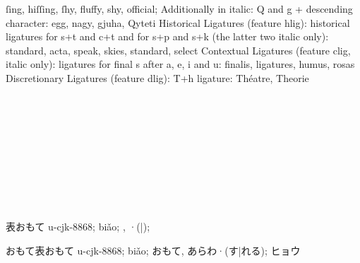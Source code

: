 \vspace{\parskip}%
\begin{multicols}{2}\raggedcolumns{}

{\mktsStyleItalic{}ſing, hiſſing, ſhy, fluffy, shy, official; Additionally in italic: Q and g + descending
character: egg, nagy, gjuha, Qyteti Historical Ligatures (feature hlig):
historical ligatures for s+t and c+t and for s+p and s+k (the latter two
italic only): standard, acta, speak, skies, standard, select Contextual
Ligatures (feature clig, italic only): ligatures for final s after a, e, i
and u: finalis, ligatures, humus, rosas Discretionary Ligatures (feature
dlig): T+h ligature: Théatre, Theorie\/}
~\\
~\\
~\\
~\\
~\\
~\\
~\\
~\\
~\\
~\\


\end{multicols}



{表{\hi{}お}{\hi{}も}{\hi{}て}} u-cjk-8868; biǎo; {}, {}{\mktsFontfileEbgaramondtwelveregular{}·}({}|{}); {}

{\mktsFontfileIpamp{}おもて表おもて u-cjk-8868; biǎo; おもて, あらわ·(す|れる); ヒョウ}

